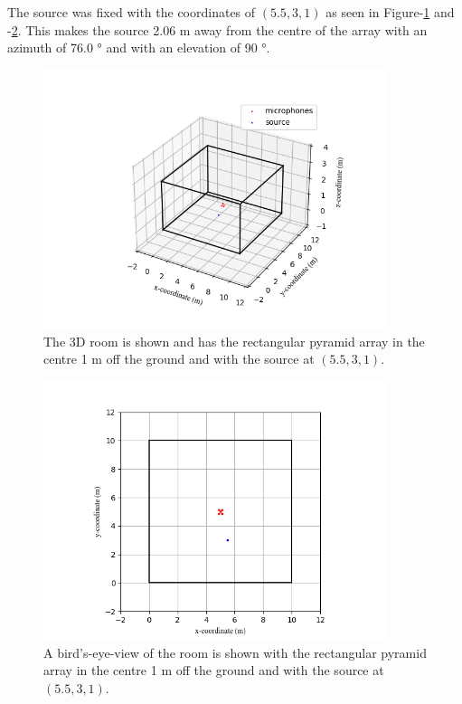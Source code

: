 \documentclass[notitlepage]{report}
\begin{document}
The source was fixed with the coordinates of $(5.5,3,1)$ as seen in Figure-\ref{fig:pyramid_robot_room_3d} and -\ref{fig:pyramid_robot_room_2d}. This makes the source 2.06 \si{m} away from the centre of the array with an azimuth of 76.0 \si{\degree} and with an elevation of 90 \si{\degree}.

\begin{figure}[H]
\includegraphics[width=0.9\textwidth]{../Python/pyramid_robot/room_3d.png}
\centering
\caption{The 3D room is shown and has the rectangular pyramid array in the centre 1 \si{m} off the ground and with the source at $(5.5,3,1)$.}
\label{fig:pyramid_robot_room_3d}
\centering
\end{figure}

\begin{figure}[H]
\includegraphics[width=0.9\textwidth]{../Python/pyramid_robot/room_2d.png}
\centering
\caption{A bird's-eye-view of the room is shown with the rectangular pyramid array in the centre 1 \si{m} off the ground and with the source at $(5.5,3,1)$.}
\label{fig:pyramid_robot_room_2d}
\centering
\end{figure}
\end{document}
